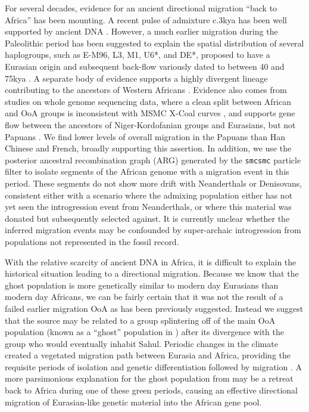 \documentclass{article}
\begin{document}
For several decades, evidence for an ancient directional migration ``back to Africa'' has been mounting. A recent pulse of admixture c.3kya has been well supported by ancient DNA \cite{Lopez2015, GallegoLlorente2015}. However, a much earlier migration during the Paleolithic period has been suggested to explain the spatial distribution of several haplogroups, such as E-M96, L3, M1, U6*, and DE*, proposed to have a Eurasian origin and subsequent back-flow variously dated to between 40 and 75kya \cite{Altheide1997, Hammer1998, Cruciani2002, Chandrasekar2007, Cabrera2018, Hervella2016, Haber2019}. A separate body of evidence supports a highly divergent lineage contributing to the ancestors of Western Africans \cite{Lipson2019, Skoglund2017, Speidel2019}. Evidence also comes from studies on whole genome sequencing data, where a clean split between African and OoA groups is inconsistent with MSMC X-Coal curves \cite{Schiffels2014}, and supports gene flow between the ancestors of Niger-Kordofanian groups and Eurasians, but not Papuans \cite{Malaspinas2016}.   We find lower levels of overall migration in the Papuans than Han Chinese and French, broadly supporting this assertion. In addition, we use the posterior ancestral recombination graph (ARG) generated by the {\tt smcsmc} particle filter to isolate segments of the African genome with a migration event in this period. These segments do not show more drift with Neanderthals or Denisovans, consistent either with a scenario where the admixing population either has not yet seen the introgression event from Neanderthals, or where this material was donated but subsequently selected against. It is currently unclear whether the inferred migration events may be confounded by super-archaic introgression \cite{Durvasula2019, Lachance2012} from populations not represented in the fossil record.  

With the relative scarcity of ancient DNA in Africa, it is difficult to explain the historical situation leading to a directional migration. Because we know that the ghost population is more genetically similar to modern day Eurasians than modern day Africans, we can be fairly certain that it was not the result of a failed earlier migration OoA as has been previously suggested. Instead we suggest that the source may be related to a group splintering off of the main OoA population (known as a ``ghost'' population in \cite{Malaspinas2016}) after its divergence with the group who would eventually inhabit Sahul. Periodic changes in the climate created a vegetated migration path between Eurasia and Africa, providing the requisite periods of isolation and genetic differentiation followed by migration \cite{Timmermann2016}. A more parsimonious explanation for the ghost population from \cite{Malaspinas2016} may be a retreat back to Africa during one of these green periods, causing an effective directional migration of Eurasian-like genetic material into the African gene pool.
\end{document}
